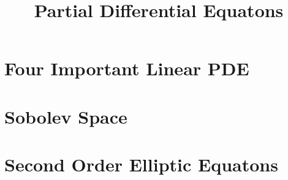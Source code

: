 \documentclass[12pt, oneside]{book}
\begin{document}
\frontmatter
\title{{\Huge{\textbf{Partial Differential Equatons}}}}
\maketitle
{}
\tableofcontents %




\mainmatter
\part{Four Important Linear PDE}





\part{}

\part{Sobolev Space}

\part{Second Order Elliptic Equatons}


\end{document}
